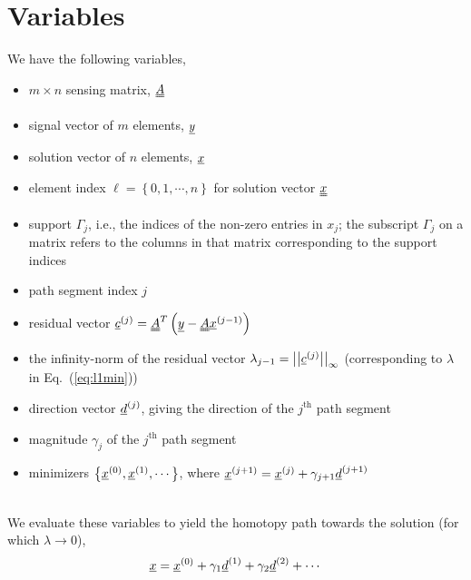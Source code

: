 \documentclass[11pt]{article} %
\begin{document}
\section{Variables}
We have the following variables,
\begin{itemize}
\item $m \times n$ sensing matrix, $\uuline{A}$
\item signal vector of $m$ elements, $\uline{y}$
\item solution vector of $n$ elements, $\uline{x}$
\item element index $\ell = \left\{0, 1, \cdots, n\right\}$ for solution vector $\uuline{x}$
\item support $\Gamma_j$, i.e., the indices of the non-zero entries in $x_j$; the subscript $\Gamma_j$ on a matrix refers to the columns in that matrix corresponding to the support indices
\item path segment index $j$
\item residual vector $\uline{c}^{(j)} = \uuline{A}^T \left(\uline{y} - \uuline{A}\uline{x}^{(j-1)}\right)$
\item the infinity-norm of the residual vector $\lambda_{j-1} = \left|\left| \uline{c}^{(j)}\right| \right|_{\infty}$ (corresponding to $\lambda$ in Eq.~(\ref{eq:l1min}))
\item direction vector $\uline{d}^{(j)}$, giving the direction of the $j^{\text{th}}$ path segment
\item magnitude $\gamma_j$ of the $j^{\text{th}}$ path segment
\item minimizers $\left\{ \uline{x}^{(0)}, \uline{x}^{(1)}, \cdots\right\}$, where $\uline{x}^{(j + 1)} = \uline{x}^{(j)} +  \gamma_{j+1}  \uline{d}^{(j+1)}$
\end{itemize}
\ \\
We evaluate these variables to yield the homotopy path towards the solution (for which $\lambda \rightarrow 0$),
\begin{equation}
\uline{x} = \uline{x}^{(0)} + \gamma_1  \uline{d}^{(1)} + \gamma_2  \uline{d}^{(2)}  + \cdots
\end{equation}
\clearpage
\end{document}
